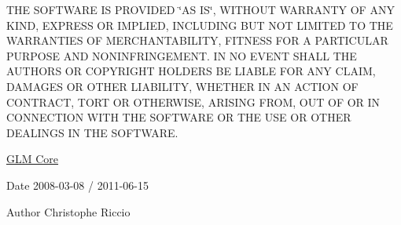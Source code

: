 T\-H\-E S\-O\-F\-T\-W\-A\-R\-E I\-S P\-R\-O\-V\-I\-D\-E\-D \char`\"{}\-A\-S I\-S\char`\"{}, W\-I\-T\-H\-O\-U\-T W\-A\-R\-R\-A\-N\-T\-Y O\-F A\-N\-Y K\-I\-N\-D, E\-X\-P\-R\-E\-S\-S O\-R I\-M\-P\-L\-I\-E\-D, I\-N\-C\-L\-U\-D\-I\-N\-G B\-U\-T N\-O\-T L\-I\-M\-I\-T\-E\-D T\-O T\-H\-E W\-A\-R\-R\-A\-N\-T\-I\-E\-S O\-F M\-E\-R\-C\-H\-A\-N\-T\-A\-B\-I\-L\-I\-T\-Y, F\-I\-T\-N\-E\-S\-S F\-O\-R A P\-A\-R\-T\-I\-C\-U\-L\-A\-R P\-U\-R\-P\-O\-S\-E A\-N\-D N\-O\-N\-I\-N\-F\-R\-I\-N\-G\-E\-M\-E\-N\-T. I\-N N\-O E\-V\-E\-N\-T S\-H\-A\-L\-L T\-H\-E A\-U\-T\-H\-O\-R\-S O\-R C\-O\-P\-Y\-R\-I\-G\-H\-T H\-O\-L\-D\-E\-R\-S B\-E L\-I\-A\-B\-L\-E F\-O\-R A\-N\-Y C\-L\-A\-I\-M, D\-A\-M\-A\-G\-E\-S O\-R O\-T\-H\-E\-R L\-I\-A\-B\-I\-L\-I\-T\-Y, W\-H\-E\-T\-H\-E\-R I\-N A\-N A\-C\-T\-I\-O\-N O\-F C\-O\-N\-T\-R\-A\-C\-T, T\-O\-R\-T O\-R O\-T\-H\-E\-R\-W\-I\-S\-E, A\-R\-I\-S\-I\-N\-G F\-R\-O\-M, O\-U\-T O\-F O\-R I\-N C\-O\-N\-N\-E\-C\-T\-I\-O\-N W\-I\-T\-H T\-H\-E S\-O\-F\-T\-W\-A\-R\-E O\-R T\-H\-E U\-S\-E O\-R O\-T\-H\-E\-R D\-E\-A\-L\-I\-N\-G\-S I\-N T\-H\-E S\-O\-F\-T\-W\-A\-R\-E.

\hyperlink{group__core}{G\-L\-M Core}

\begin{DoxyDate}{Date}
2008-\/03-\/08 / 2011-\/06-\/15 
\end{DoxyDate}
\begin{DoxyAuthor}{Author}
Christophe Riccio 
\end{DoxyAuthor}

